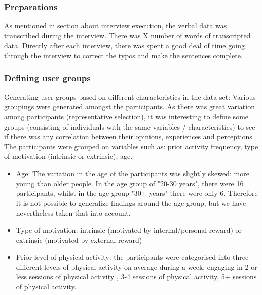     \subsubsection{Preparations}
    As mentioned in section about interview execution, the verbal data was transcribed during the interview. There was X number of words of transcripted data. 
    Directly after each interview, there was spent a good deal of time going through the interview to correct the typos and make the sentences complete. 

    \subsubsection{Defining user groups}
    Generating user groups based on different characteristics in the data set: Various groupings were generated amongst the participants. As there was great variation among participants (representative selection), it was interesting to define some groups (consisting of individuals with the same variables / characteristics) to see if there was any correlation between their opinions, experiences and perceptions. The participants were grouped on variables such as: prior activity frequency, type of motivation (intrinsic or extrinsic), age.
    
\begin{itemize}
\item Age: The variation in the age of the participants was slightly skewed: more young than older people. In the age group of "20-30 years", there were 16 participants, whilst in the age group "30+ years" there were only 6. Therefore it is not possible to generalize findings around the age group, but we have nevertheless taken that into account.
\item     Type of motivation: intrinsic (motivated by internal/personal reward) or extrinsic (motivated by external reward)
\item     Prior level of physical activity: the participants were categorised into three different levels of physical activity on average during a week; engaging in 2 or less sessions of physical activity , 3-4 sessions of physical activity, 5+ sessions of physical activity. 
\end{itemize}
    
